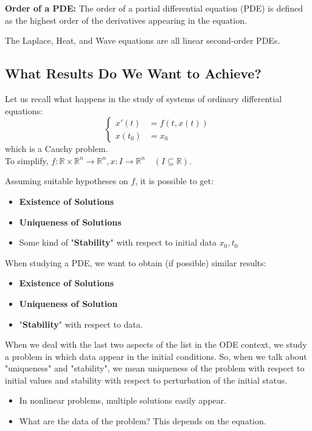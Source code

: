 \begin{DefBox}
    \begin{Def}
        \textbf{Order of a PDE:} The order of a partial differential equation (PDE) is defined as the highest order of the derivatives appearing in the equation.
    \end{Def}
\end{DefBox}

The Laplace, Heat, and Wave equations are all linear second-order PDEs.
\subsection{What Results Do We Want to Achieve?}

Let us recall what happens in the study of systems of ordinary differential equations:
\[
\begin{cases}
    x'(t) &= f(t, x(t))\\
    x(t_0) &= x_0
\end{cases}
\]
which is a Cauchy problem.\\ 
To simplify, \( f: \mathbb{R} \times \mathbb{R}^n \to \mathbb{R}^n, x: I \rightarrow \mathbb{R}^n \quad  (I \subseteq \mathbb{R}) \).


Assuming suitable hypotheses on \( f \), it is possible to get:
\begin{itemize}
    \item \textbf{Existence of Solutions}
    \item \textbf{Uniqueness of Solutions}
    \item Some kind of "\textbf{Stability}" with respect to initial data \( x_0, t_0 \)
\end{itemize}




When studying a PDE, we want to obtain (if possible) similar results:

\begin{itemize}
    \item \textbf{Existence of Solutions}
    \item \textbf{Uniqueness of Solution}
    \item "\textbf{Stability}" with respect to data.
\end{itemize}

When we deal with the last two aspects of the list in the ODE context, we study a problem in which data appear in the initial conditions. So, when we talk about "uniqueness" and "stability", we mean uniqueness of the problem with respect to initial values and stability with respect to perturbation of the initial status. \begin{remark}
    
\begin{itemize}
    \item In nonlinear problems, multiple solutions easily appear.
    \item What are the data of the problem? This depends on the equation.
\end{itemize}
\end{remark}

